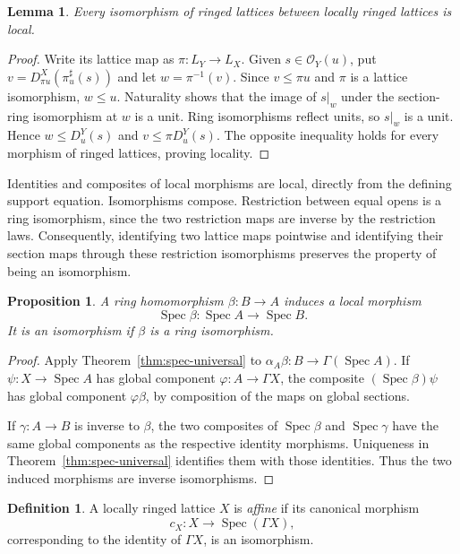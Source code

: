 \documentclass[11pt]{amsart}
\newtheorem{proposition}[theorem]{Proposition}
\newtheorem{lemma}[theorem]{Lemma}
\theoremstyle{definition}
\newtheorem{definition}[theorem]{Definition}
\theoremstyle{remark}
\newcommand{\Spec}{\operatorname{Spec}}
\newcommand{\OO}{\mathcal O}
\newcommand{\restr}[2]{#1|_{#2}}
\begin{document}
\begin{lemma}\label{lem:iso-local}
Every isomorphism of ringed lattices between locally ringed lattices is
local.
\end{lemma}
\begin{proof}
Write its lattice map as $\pi:L_Y\to L_X$. Given $s\in\OO_Y(u)$, put
$v=D^X_{\pi u}(\pi^\sharp_u(s))$ and let $w=\pi^{-1}(v)$. Since
$v\leq\pi u$ and $\pi$ is a lattice isomorphism, $w\leq u$.
Naturality shows that the image of $\restr{s}{w}$ under the section-ring
isomorphism at $w$ is a unit. Ring isomorphisms reflect units, so
$\restr{s}{w}$ is a unit. Hence $w\leq D^Y_u(s)$ and
$v\leq\pi D^Y_u(s)$. The opposite inequality holds for every morphism
of ringed lattices, proving locality.
\end{proof}

Identities and composites of local morphisms are local, directly from
the defining support equation. Isomorphisms compose. Restriction between
equal opens is a ring isomorphism, since the two restriction maps are
inverse by the restriction laws. Consequently, identifying two lattice
maps pointwise and identifying their section maps through these
restriction isomorphisms preserves the property of being an isomorphism.

\begin{proposition}\label{prop:spec-map}
A ring homomorphism $\beta:B\to A$ induces a local morphism
\[
 \Spec\beta:\Spec A\longrightarrow\Spec B.
\]
It is an isomorphism if $\beta$ is a ring isomorphism.
\end{proposition}
\begin{proof}
Apply Theorem~\ref{thm:spec-universal} to
$\alpha_A\beta:B\to\Gamma(\Spec A)$. If
$\psi:X\to\Spec A$ has global component $\varphi:A\to\Gamma X$,
the composite $(\Spec\beta)\psi$ has global component $\varphi\beta$,
by composition of the maps on global sections.

If $\gamma:A\to B$ is inverse to $\beta$, the two composites of
$\Spec\beta$ and $\Spec\gamma$ have the same global components as
the respective identity morphisms. Uniqueness in
Theorem~\ref{thm:spec-universal} identifies them with those identities.
Thus the two induced morphisms are inverse isomorphisms.
\end{proof}

\begin{definition}
A locally ringed lattice $X$ is \emph{affine} if its canonical morphism
\[
 c_X:X\longrightarrow\Spec(\Gamma X),
\]
corresponding to the identity of $\Gamma X$, is an isomorphism.
\end{definition}
\end{document}
